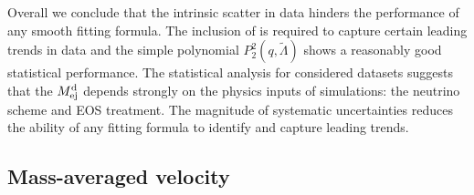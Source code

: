Overall we conclude that the intrinsic scatter in data hinders the performance 
of any smooth fitting formula. The inclusion of \mr{} is required to capture  
certain leading trends in data and the simple polynomial 
$P_2^2(q,\tilde{\Lambda})$ shows a reasonably good statistical performance.
%
The statistical analysis for considered datasets suggests that the $M^{\text{d}}_{\text{ej}}$ depends 
strongly on the physics inputs of simulations: the neutrino scheme and \ac{EOS} treatment.
The magnitude of systematic uncertainties reduces the ability of any fitting formula 
to identify and capture leading trends.




\subsection{Mass-averaged velocity}\label{sec:stat:vejstat}



%

